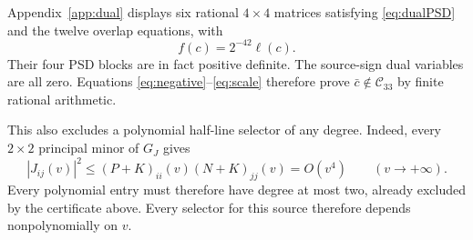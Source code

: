 \documentclass[10pt]{article}
\newcommand{\Cq}{\mathcal C_{33}}
\begin{document}
Appendix~\ref{app:dual} displays six rational $4\times4$ matrices satisfying
\eqref{eq:dualPSD} and the twelve overlap equations, with
\begin{equation}
                         f(c)=2^{-42}\ell(c).              \label{eq:scale}
\end{equation}
Their four PSD blocks are in fact positive definite. The source-sign dual
variables are all zero. Equations \eqref{eq:negative}--\eqref{eq:scale}
therefore prove $\bar c\notin\Cq$ by finite rational arithmetic.

This also excludes a polynomial half-line selector of any degree. Indeed,
every $2\times2$ principal minor of $G_J$ gives
\[
|J_{ij}(v)|^2\leq(P+K)_{ii}(v)(N+K)_{jj}(v)=O(v^4)
\qquad(v\longrightarrow+\infty).
\]
Every polynomial entry must therefore have degree at most two, already
excluded by the certificate above. Every selector for this source therefore depends nonpolynomially on $v$.
\end{document}
